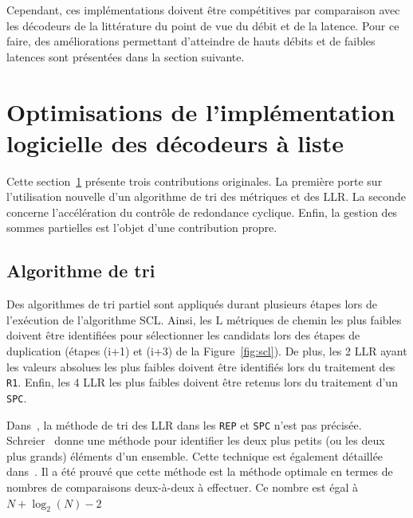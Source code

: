 Cependant, ces implémentations doivent être compétitives par comparaison avec les décodeurs de la littérature du point de vue du débit et de la latence. Pour ce faire, des améliorations permettant d'atteindre de hauts débits et de faibles latences sont présentées dans la section suivante.

\section{Optimisations de l'implémentation logicielle des décodeurs à liste}
\label{sec:opti_scl}
Cette section~\ref{sec:opti_scl} présente trois contributions originales. La première porte sur l'utilisation nouvelle d'un algorithme de tri des métriques et des LLR. La seconde concerne l'accélération du contrôle de redondance cyclique. Enfin, la gestion des sommes partielles est l'objet d'une contribution propre.

\subsection{Algorithme de tri}
Des algorithmes de tri partiel sont appliqués durant plusieurs étapes lors de l'exécution de l'algorithme SCL. Ainsi, les $\mathrm{L}$ métriques de chemin les plus faibles doivent être identifiées pour sélectionner les candidats lors des étapes de duplication (étapes (i+1) et (i+3) de la Figure~\ref{fig:scl}). De plus, les 2 LLR ayant les valeurs absolues les plus faibles doivent être identifiés lors du traitement des \noeuds \texttt{R1}. Enfin, les 4 LLR les plus faibles doivent être retenus lors du traitement d'un \noeud \texttt{SPC}. 


Dans~\cite{sarkis_fast_2016}, la méthode de tri des LLR dans les \noeuds \texttt{REP} et \texttt{SPC} n'est pas précisée.
Schreier~\cite{schreier_tournament_1932} donne une méthode pour identifier les deux plus petits (ou les deux plus grands) éléments d'un ensemble. Cette technique est également détaillée dans~\cite{knuth_art_1973}. 
Il a été prouvé que cette méthode est la méthode optimale en termes de nombres de comparaisons deux-à-deux à effectuer.
Ce nombre est égal à $N+\log_2(N)-2$

